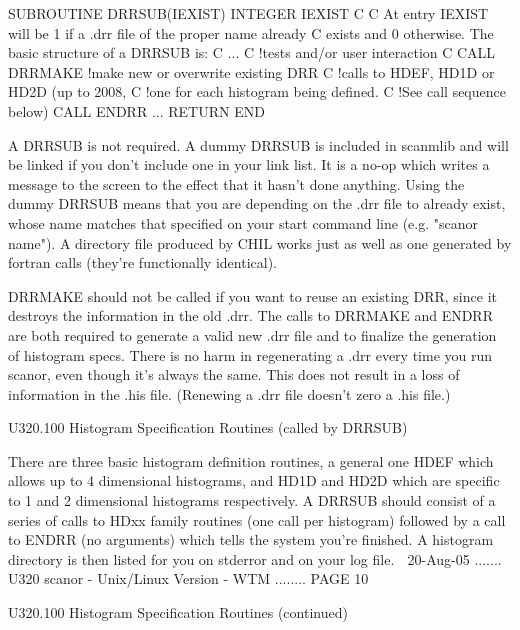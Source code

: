          SUBROUTINE DRRSUB(IEXIST)
         INTEGER IEXIST
   C
   C     At entry  IEXIST will be 1 if a .drr file of the proper name already
   C     exists and 0 otherwise. The basic structure of a DRRSUB is:
   C
         ...
   C                      !tests and/or user interaction
   C
         CALL DRRMAKE     !make new or overwrite existing DRR
   C                      !calls to HDEF, HD1D or HD2D (up to 2008,
   C                      !one for each histogram being defined.
   C                      !See call sequence below)
         CALL ENDRR
         ...
         RETURN
         END
 
   A DRRSUB is not required. A dummy DRRSUB is included in scanmlib  and  will
   be  linked  if you don't include one in your link list. It is a no-op which
   writes a message to the screen to the effect that it hasn't done  anything.
   Using  the  dummy  DRRSUB  means that you are depending on the .drr file to
   already exist, whose name matches that specified on your start command line
   (e.g. "scanor name"). A directory file produced by CHIL works just as  well
   as one generated by fortran calls (they're functionally identical).
 
   DRRMAKE  should  not  be called if you want to reuse an existing DRR, since
   it destroys the information in the old  .drr.  The  calls  to  DRRMAKE  and
   ENDRR  are  both required to generate a valid new .drr file and to finalize
   the generation of histogram specs. There is no harm in regenerating a  .drr
   every  time you run scanor, even though it's always the same. This does not
   result in a loss of information in the .his file.  (Renewing  a  .drr  file
   doesn't zero a .his file.)
 
   U320.100  Histogram Specification Routines (called by DRRSUB)
 
   There  are  three  basic  histogram definition routines, a general one HDEF
   which allows up to 4 dimensional histograms, and HD1D and  HD2D  which  are
   specific  to  1  and 2 dimensional histograms respectively. A DRRSUB should
   consist of a series  of  calls  to  HDxx  family  routines  (one  call  per
   histogram)  followed  by  a  call  to  ENDRR (no arguments) which tells the
   system you're finished. A histogram directory is then  listed  for  you  on
   stderror and on your log file.
    
   20-Aug-05 ....... U320  scanor - Unix/Linux Version - WTM ........ PAGE  10
 
 
   U320.100  Histogram Specification Routines (continued)
 
